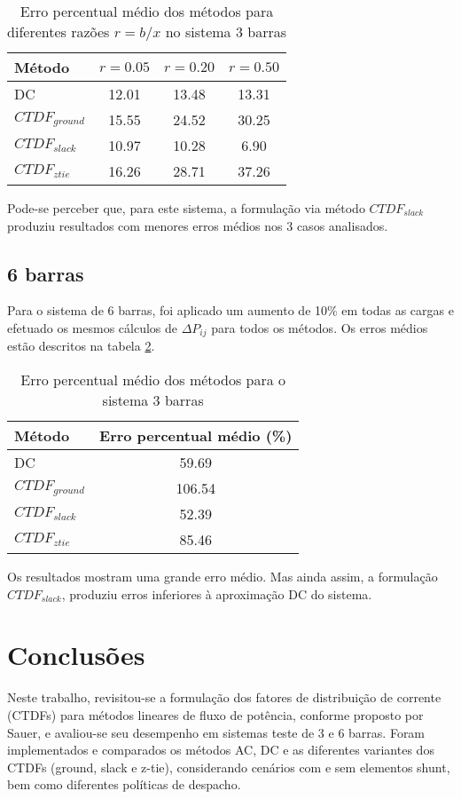 \documentclass[journal]{IEEEtran}
\begin{document}
\begin{table}[!ht]
\centering
\caption{Erro percentual médio dos métodos para diferentes razões $r = b/x$ no sistema 3 barras}
\label{tab:erro_3bus_bx}
\begin{tabular}{l|ccc}
\hline
Método & $r=0.05$ & $r=0.20$ & $r=0.50$ \\
\hline
DC                & 12.01 & 13.48 & 13.31 \\
$CTDF_{ground}$   & 15.55 & 24.52 & 30.25 \\
$CTDF_{slack}$    & 10.97 & 10.28 & 6.90 \\
$CTDF_{ztie}$     & 16.26 & 28.71 & 37.26 \\
\hline
\end{tabular}
\end{table}

Pode-se perceber que, para este sistema, a formulação via método $CTDF_{slack}$ produziu resultados com menores erros médios nos 3 casos analisados.


\subsection{6 barras}
Para o sistema de 6 barras, foi aplicado um aumento de 10\% em todas as cargas e efetuado os mesmos cálculos de $\Delta P_{ij}$ para todos os métodos. Os erros médios estão descritos na tabela \ref{tab:erro_6bus}.

\begin{table}[!ht]
\centering
\caption{Erro percentual médio dos métodos para o sistema 3 barras}
\label{tab:erro_6bus}
\begin{tabular}{l|c}
\hline
Método            & Erro percentual médio (\%) \\
\hline
DC                & 59.69 \\
$CTDF_{ground}$   & 106.54 \\
$CTDF_{slack}$    & 52.39 \\
$CTDF_{ztie}$     & 85.46 \\
\hline
\end{tabular}
\end{table}

Os resultados mostram uma grande erro médio. Mas ainda assim, a formulação $CTDF_{slack}$, produziu erros inferiores à aproximação DC do sistema.




\section{Conclusões}
Neste trabalho, revisitou-se a formulação dos fatores de distribuição de corrente (CTDFs) para métodos lineares de fluxo de potência, conforme proposto por Sauer, e avaliou-se seu desempenho em sistemas teste de 3 e 6 barras. Foram implementados e comparados os métodos AC, DC e as diferentes variantes dos CTDFs (ground, slack e z-tie), considerando cenários com e sem elementos shunt, bem como diferentes políticas de despacho.
\end{document}
